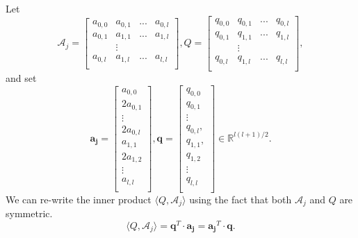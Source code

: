 \documentclass[12pt]{amsart}
\numberwithin{equation}{section}
\theoremstyle{definition}
\numberwithin{thm}{section}
\begin{document}
\smallskip
Let 
\begin{equation*}
     \mathcal{A}_j = \begin{bmatrix}
          a_{0, 0} & a_{0, 1} & ... &a_{0, l}\\
          a_{0, 1} & a_{1, 1} & ... &a_{1, l} \\
          & \vdots \\
          a_{0, l} & a_{1, l} &... &a_{l, l}\\
\end{bmatrix}, 
     Q = \begin{bmatrix}
          q_{0, 0} & q_{0, 1} & ... &q_{0, l}\\
          q_{0, 1} & q_{1, 1} & ... &q_{1, l} \\
          & \vdots \\
          q_{0, l} & q_{1, l} &... &q_{l, l}\\
     \end{bmatrix},
\end{equation*}
and set
\begin{equation*}
     \mathbf{a_j} = \begin{bmatrix}
          a_{0, 0}\\
          2a_{0, 1} \\
          \vdots \\
          2a_{0, l} \\ a_{1, 1} \\ 2a_{1, 2} \\
          \vdots \\
          a_{l, l}\\
     \end{bmatrix},   
     \mathbf{q} = \begin{bmatrix}
          q_{0, 0}\\
          q_{0, 1} \\
          \vdots \\
          q_{0,l}, \\q_{1,1}, \\q_{1,2}\\
          \vdots \\
          q_{l, l}\\
     \end{bmatrix}\in \mathbb{R}^{l(l+1)/2}.
\end{equation*}
We can re-write the inner product $\langle Q, \mathcal{A}_j \rangle$ using the fact that both $\mathcal{A}_j$ and $Q$ are symmetric. \begin{equation*}
     \langle Q, \mathcal{A}_j \rangle = \mathbf{q}^T \cdot \mathbf{a_j} = \mathbf{a_j}^T \cdot \mathbf{q}.
\end{equation*}
\end{document}
